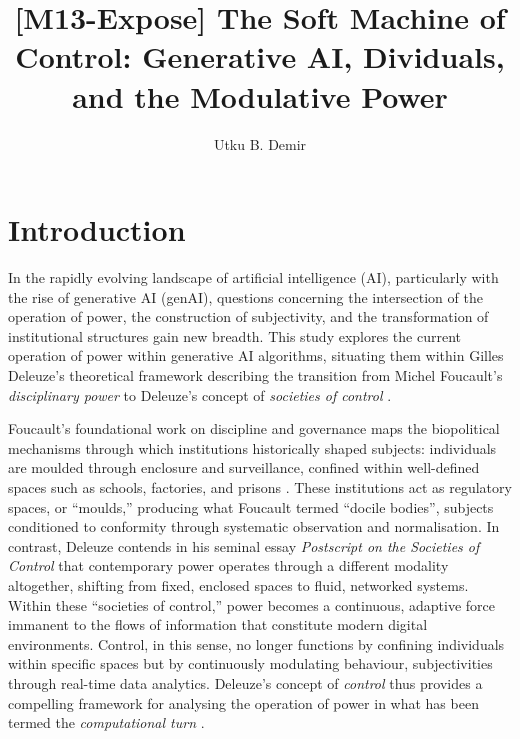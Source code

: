 
\title{[M13-Expose] The Soft Machine of Control: Generative AI, Dividuals, and the Modulative Power}
\author{Utku B. Demir}
\date{\yesterday}


\maketitle

\section{Introduction}

In the rapidly evolving landscape of artificial intelligence (AI), particularly with the rise of generative AI (genAI), questions concerning the intersection of the operation of power, the construction of subjectivity, and the transformation of institutional structures gain new breadth.  This study explores the current operation of power within generative AI algorithms, situating them within Gilles Deleuze's theoretical framework describing the transition from Michel Foucault's \textit{disciplinary power} \parencite[]{Foucault1995} to Deleuze's concept of \textit{societies of control} \parencite[]{deleuze1995a}.

Foucault’s foundational work on discipline and governance maps the biopolitical mechanisms through which institutions historically shaped subjects: individuals are moulded through enclosure and surveillance, confined within well-defined spaces such as schools, factories, and prisons \parencite[]{foucault2008a, Foucault1995}. These institutions act as regulatory spaces, or “moulds,” producing what Foucault termed “docile bodies”, subjects conditioned to conformity through systematic observation and normalisation. In contrast, Deleuze contends in his seminal essay \textit{Postscript on the Societies of Control} \parencite[]{deleuze1995a} that contemporary power operates through a different modality altogether, shifting from fixed, enclosed spaces to fluid, networked systems. Within these “societies of control,” power becomes a continuous, adaptive force immanent to the flows of information that constitute modern digital environments. Control, in this sense, no longer functions by confining individuals within specific spaces but by continuously modulating behaviour, subjectivities through real-time data analytics. Deleuze’s concept of \textit{control} thus provides a compelling framework for analysing the operation of power in what has been termed the \textit{computational turn} .

